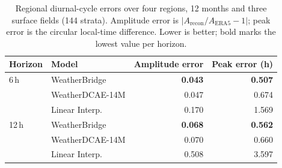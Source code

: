 \begin{table}[!htbp]
\centering
\caption{Regional diurnal-cycle errors over four regions, 12 months and three surface fields (144 strata). Amplitude error is $|A_{\mathrm{recon}}/A_{\mathrm{ERA5}}-1|$; peak error is the circular local-time difference. Lower is better; bold marks the lowest value per horizon.}
\label{tab:diurnal}
\small
\setlength{\tabcolsep}{5pt}
\begin{tabular}{llrr}
\toprule
Horizon & Model & Amplitude error & Peak error (h) \\
\midrule
6\,h & WeatherBridge & \textbf{0.043} & \textbf{0.507} \\
 & WeatherDCAE-14M & 0.047 & 0.674 \\
 & Linear Interp. & 0.170 & 1.569 \\
\midrule
12\,h & WeatherBridge & \textbf{0.068} & \textbf{0.562} \\
 & WeatherDCAE-14M & 0.070 & 0.660 \\
 & Linear Interp. & 0.508 & 3.597 \\
\bottomrule
\end{tabular}
\end{table}
